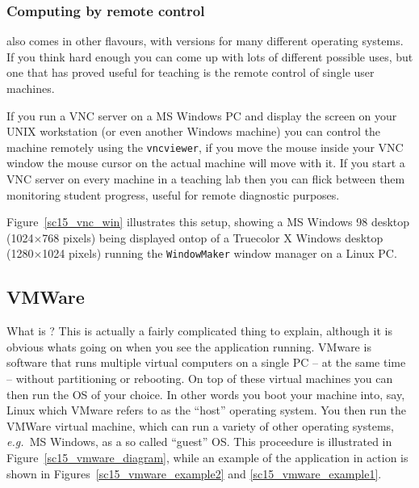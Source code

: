 \documentclass[twoside,11pt]{starlink}
\begin{document}
\subsubsection{Computing by remote control}

 also
comes in other flavours, with versions for many different operating
systems. If you think hard enough you can come up with lots of
different possible uses, but one that has proved useful for teaching
is the remote control of single user machines.

If you run a VNC server on a MS Windows PC and display the screen on
your UNIX workstation (or even another Windows machine) you can
control the machine remotely using the \texttt{vncviewer}, if you move
the mouse inside your VNC window the mouse cursor on the actual
machine will move with it. If you start a VNC server on every machine
in a teaching lab then you can flick between them monitoring student
progress, useful for remote diagnostic purposes.


Figure~\ref{sc15_vnc_win} illustrates this setup, showing a MS Windows
98 desktop (1024$\times$768 pixels) being displayed ontop of a
Truecolor X Windows desktop (1280$\times$1024 pixels) running the \texttt{WindowMaker} window manager on a Linux PC.

\subsection{VMWare\label{sc15_vmware}}

What is ? This is
actually a fairly complicated thing to explain, although it is obvious
whats going on when you see the application running. VMware is
software that runs multiple virtual computers on a single PC -- at the
same time -- without partitioning or rebooting. On top of these
virtual machines you can then run the OS of your choice. In other
words you boot your machine into, say, Linux which VMware refers to as
the ``host'' operating system. You then run the VMWare virtual
machine, which can run a variety of other operating systems, \emph{e.g.\ }MS Windows, as a so called ``guest'' OS. This proceedure is
illustrated in Figure~\ref{sc15_vmware_diagram}, while an example of
the application in action is shown in
Figures~\ref{sc15_vmware_example2} and \ref{sc15_vmware_example1}.
\end{document}
